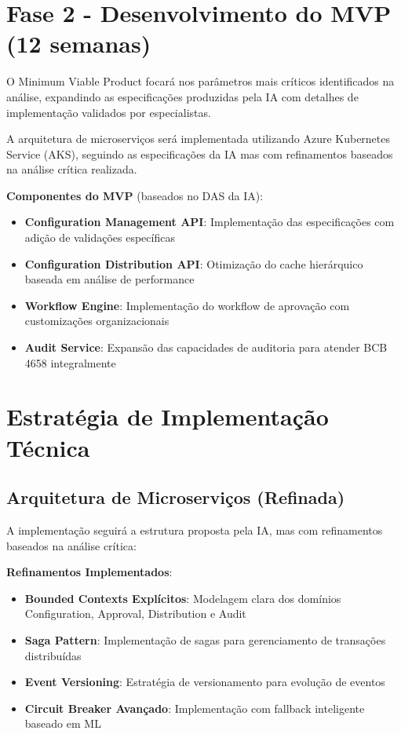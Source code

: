 \section{Fase 2 - Desenvolvimento do MVP (12 semanas)}

O Minimum Viable Product focará nos parâmetros mais críticos identificados na análise, expandindo as especificações produzidas pela IA com detalhes de implementação validados por especialistas.

A arquitetura de microserviços será implementada utilizando Azure Kubernetes Service (AKS), seguindo as especificações da IA mas com refinamentos baseados na análise crítica realizada.

\textbf{Componentes do MVP} (baseados no DAS da IA):
\begin{itemize}
\item \textbf{Configuration Management API}: Implementação das especificações com adição de validações específicas
\item \textbf{Configuration Distribution API}: Otimização do cache hierárquico baseada em análise de performance
\item \textbf{Workflow Engine}: Implementação do workflow de aprovação com customizações organizacionais
\item \textbf{Audit Service}: Expansão das capacidades de auditoria para atender BCB 4658 integralmente
\end{itemize}

\section{Estratégia de Implementação Técnica}

\subsection{Arquitetura de Microserviços (Refinada)}

A implementação seguirá a estrutura proposta pela IA, mas com refinamentos baseados na análise crítica:

\textbf{Refinamentos Implementados}:
\begin{itemize}
\item \textbf{Bounded Contexts Explícitos}: Modelagem clara dos domínios Configuration, Approval, Distribution e Audit
\item \textbf{Saga Pattern}: Implementação de sagas para gerenciamento de transações distribuídas
\item \textbf{Event Versioning}: Estratégia de versionamento para evolução de eventos
\item \textbf{Circuit Breaker Avançado}: Implementação com fallback inteligente baseado em ML
\end{itemize}

